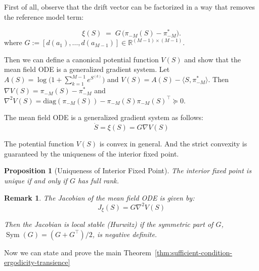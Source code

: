 \documentclass[12pt]{article}
\newtheorem{proposition}{Proposition}
\newtheorem{remark}{Remark}
\DeclareMathOperator{\Sym}{Sym}
\begin{document}
First of all, observe that the drift vector can be factorized in a way that removes the reference model term:

\begin{equation}
    \xi(S)\;=\; G\,\big(\pi_{-M}(S)-\pi_{-M}^*\big).
    \label{eq:xi-factor}
\end{equation}
where $G := [d(a_1), \ldots, d(a_{M-1})] \in \mathbb{R}^{(M-1) \times (M-1)}$.
    
Then we can define a canonical potential function $V(S)$ and show that the mean field ODE is a generalized gradient system. Let $A(S)=\log\!\big(1+\sum_{k=1}^{M-1}e^{S^{(k)}}\big)$ and $V(S)=A(S)-\langle S,\pi_{-M}^*\rangle$. Then $\nabla V(S)=\pi_{-M}(S)-\pi_{-M}^*$ and $\nabla^2 V(S)=\mathrm{diag}(\pi_{-M}(S))-\pi_{-M}(S)\pi_{-M}(S)^\top\succeq 0$.

The mean field ODE is a generalized gradient system as follows:
\begin{equation}
    \dot S = \xi(S) = G \nabla V(S)
\end{equation}


The potential function $V(S)$ is convex in general. And the strict convexity is guaranteed by the uniqueness of the interior fixed point.

\begin{proposition}[Uniqueness of Interior Fixed Point]
    \label{prop:uniqueness_simple}
    The interior fixed point is unique if and only if $G$ has full rank.
    \end{proposition}


\begin{remark}
    The Jacobian of the mean field ODE is given by:
    \begin{equation}
        J_{\xi}(S) = G \nabla^2 V(S)
    \end{equation}

    Then the Jacobian is local stable (Hurwitz) if the symmetric part of $G$, $\Sym(G) = (G + G^\top)/2$, is negative definite.
\end{remark}


Now we can state and prove the main Theorem~\ref{thm:sufficient-condition-ergodicity-transience}
\end{document}
